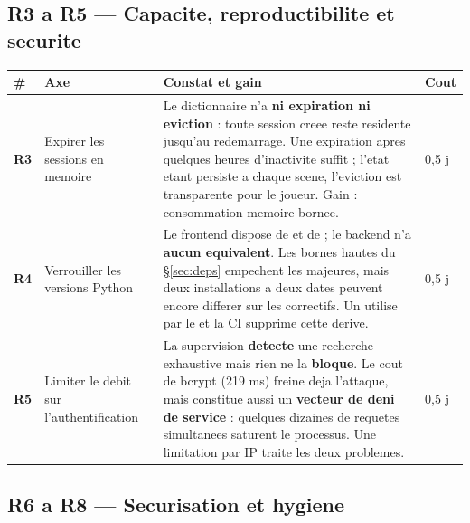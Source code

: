 \subsection{R3 a R5 --- Capacite, reproductibilite et securite}

\footnotesize
\begin{tabularx}{\linewidth}{@{}L{1.1cm} L{3.4cm} X L{1.3cm}@{}}
\toprule
\textbf{\#} & \textbf{Axe} & \textbf{Constat et gain} & \textbf{Cout} \\
\midrule
\textbf{R3} & Expirer les sessions en memoire &
Le dictionnaire  n'a \textbf{ni expiration ni eviction} : toute session creee reste
residente jusqu'au redemarrage. Une expiration apres quelques heures d'inactivite suffit ; l'etat
etant persiste a chaque scene, l'eviction est transparente pour le joueur. Gain : consommation
memoire bornee. & 0,5 j \\
\addlinespace
\textbf{R4} & Verrouiller les versions Python &
Le frontend dispose de  et de  ; le backend n'a
\textbf{aucun equivalent}. Les bornes hautes du \S\ref{sec:deps} empechent les majeures, mais deux
installations a deux dates peuvent encore differer sur les correctifs. Un
 utilise par le  et la CI supprime cette
derive. & 0,5 j \\
\addlinespace
\textbf{R5} & Limiter le debit sur l'authentification &
La supervision \textbf{detecte} une recherche exhaustive mais rien ne la \textbf{bloque}. Le cout
de bcrypt (219 ms) freine deja l'attaque, mais constitue aussi un \textbf{vecteur de deni de
service} : quelques dizaines de requetes simultanees saturent le processus. Une limitation par IP
traite les deux problemes. & 0,5 j \\
\bottomrule
\end{tabularx}
\normalsize

\subsection{R6 a R8 --- Securisation et hygiene}

